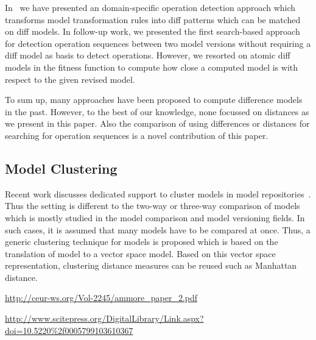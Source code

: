 In~\cite{} we have presented an domain-specific operation detection approach which transforms model transformation rules into diff patterns which can be matched on diff models. In follow-up work, we presented the first search-based approach for detection operation sequences between two model versions without requiring a diff model as basis to detect operations. However, we resorted on atomic diff models in the fitness function to compute how close a computed model is with respect to the given revised model. 

To sum up, many approaches have been proposed to compute difference models in the past. However, to the best of our knowledge, none focussed on distances as we present in this paper. Also the comparison of using differences or distances for searching for operation sequences is a novel contribution of this paper. 

\subsection{Model Clustering}

Recent work discusses dedicated support to cluster models in model repositories~\cite{}. Thus the setting is different to the two-way or three-way comparison of models which is mostly studied in the model comparison and model versioning fields. In such cases, it is assumed that many models have to be compared at once. Thus, a generic clustering technique for models is proposed which is based on the translation of model to a vector space model. Based on this vector space representation, clustering distance measures can be reused such as Manhattan distance.

\url{http://ceur-ws.org/Vol-2245/ammore_paper\_2.pdf}

\url{http://www.scitepress.org/DigitalLibrary/Link.aspx?doi=10.5220\%2f0005799103610367}

